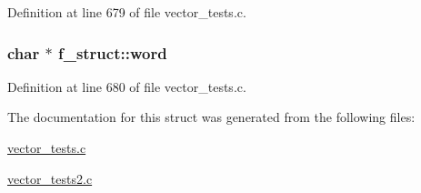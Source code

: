 Definition at line 679 of file vector\-\_\-tests.\-c.

\hypertarget{structf__struct_a2f602b9f217951fe83dd040b4fd79687}{
\subsubsection[{word}]{\setlength{\rightskip}{0pt plus 5cm}char $\ast$ f\-\_\-struct\-::word}}\label{structf__struct_a2f602b9f217951fe83dd040b4fd79687}


Definition at line 680 of file vector\-\_\-tests.\-c.



The documentation for this struct was generated from the following files\-:\begin{DoxyCompactItemize}
\item 
\hyperlink{vector__tests_8c}{vector\-\_\-tests.\-c}\item 
\hyperlink{vector__tests2_8c}{vector\-\_\-tests2.\-c}\end{DoxyCompactItemize}
